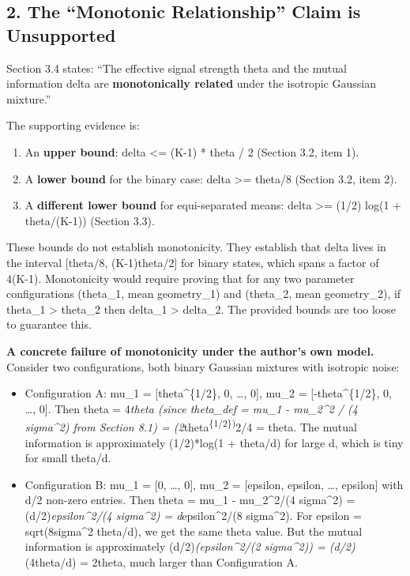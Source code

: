 \documentclass[
  12pt,
]{article}
\providecommand{\tightlist}{%
  \setlength{\itemsep}{0pt}\setlength{\parskip}{0pt}}
\begin{document}
\subsection{2. The ``Monotonic Relationship'' Claim is
Unsupported}\label{the-monotonic-relationship-claim-is-unsupported}

Section 3.4 states: ``The effective signal strength theta and the mutual
information delta are \textbf{monotonically related} under the isotropic
Gaussian mixture.''

The supporting evidence is:

\begin{enumerate}
\def\labelenumi{\arabic{enumi}.}
\tightlist
\item
  An \textbf{upper bound}: delta \textless= (K-1) * theta / 2 (Section
  3.2, item 1).
\item
  A \textbf{lower bound} for the binary case: delta \textgreater=
  theta/8 (Section 3.2, item 2).
\item
  A \textbf{different lower bound} for equi-separated means: delta
  \textgreater= (1/2) log(1 + theta/(K-1)) (Section 3.3).
\end{enumerate}

These bounds do not establish monotonicity. They establish that delta
lives in the interval {[}theta/8, (K-1)theta/2{]} for binary states,
which spans a factor of 4(K-1). Monotonicity would require proving that
for any two parameter configurations (theta\_1, mean geometry\_1) and
(theta\_2, mean geometry\_2), if theta\_1 \textgreater{} theta\_2 then
delta\_1 \textgreater{} delta\_2. The provided bounds are too loose to
guarantee this.

\textbf{A concrete failure of monotonicity under the author's own
model.} Consider two configurations, both binary Gaussian mixtures with
isotropic noise:

\begin{itemize}
\tightlist
\item
  Configuration A: mu\_1 = {[}theta\^{}\{1/2\}, 0, \ldots, 0{]}, mu\_2 =
  {[}-theta\^{}\{1/2\}, 0, \ldots, 0{]}. Then theta = 4\emph{theta
  (since theta\_def = \textbar\textbar mu\_1 -
  mu\_2\textbar\textbar\^{}2 / (4 sigma\^{}2) from Section 8.1) =
  (2}theta\textsuperscript{\{1/2\})}2/4 = theta. The mutual information
  is approximately (1/2)*log(1 + theta/d) for large d, which is tiny for
  small theta/d.
\item
  Configuration B: mu\_1 = {[}0, \ldots, 0{]}, mu\_2 = {[}epsilon,
  epsilon, \ldots, epsilon{]} with d/2 non-zero entries. Then theta =
  \textbar\textbar mu\_1 - mu\_2\textbar\textbar\^{}2/(4 sigma\^{}2) =
  (d/2)\emph{epsilon\^{}2/(4 sigma\^{}2) = d}epsilon\^{}2/(8
  sigma\^{}2). For epsilon = sqrt(8sigma\^{}2 theta/d), we get the same
  theta value. But the mutual information is approximately
  (d/2)\emph{(epsilon\^{}2/(2 sigma\^{}2)) = (d/2)}(4theta/d) = 2theta,
  much larger than Configuration A.
\end{itemize}
\end{document}
